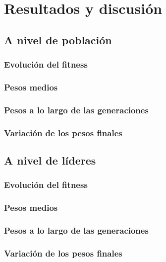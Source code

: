 \chapter{Resultados y discusión}

\section{A nivel de población}


\subsection{Evolución del fitness}


\subsection{Pesos medios}


\subsection{Pesos a lo largo de las generaciones}


\subsection{Variación de los pesos finales}


\section{A nivel de líderes}


\subsection{Evolución del fitness}


\subsection{Pesos medios}


\subsection{Pesos a lo largo de las generaciones}


\subsection{Variación de los pesos finales}